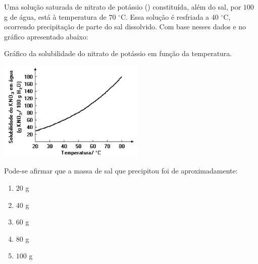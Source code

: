 Uma solução saturada de nitrato de potássio () constituída, além do sal, por $100$ g de água, está à temperatura de $70$ $^\circ$C.
Essa solução é resfriada a $40$ $^\circ$C, ocorrendo precipitação de parte do sal dissolvido.
Com base nesses dados e no gráfico apresentado abaixo:

Gráfico da solubilidade do nitrato de potássio em função da temperatura.

\begin{center}

\includegraphics[width = 7cm]{figure.png}

\end{center}

Pode-se afirmar que a massa de sal que precipitou foi de aproximadamente:

\begin{enumerate}[label = (\alph*)]
	\item $20$ g
	\item $40$ g
	\item $60$ g
	\item $80$ g
	\item $100$ g
\end{enumerate}
